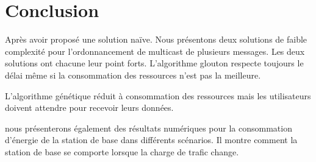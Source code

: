 \documentclass[runningheads]{llncs}
\begin{document}




\section*{Conclusion}
Après avoir proposé une solution naïve.
Nous présentons deux solutions de faible complexité 
pour l'ordonnancement de multicast de plusieurs messages.
Les deux solutions ont chacune leur point forts.
L'algorithme glouton respecte toujours le délai même si 
la consommation des ressources n'est pas la meilleure.

L'algorithme génétique réduit à consommation des ressources 
mais les utilisateurs doivent attendre pour recevoir leurs données.

nous présenterons également des résultats numériques pour la 
consommation d'énergie de la station de base dans différents scénarios.
Il montre comment la station de base se comporte lorsque la charge de trafic change.


\end{document}
